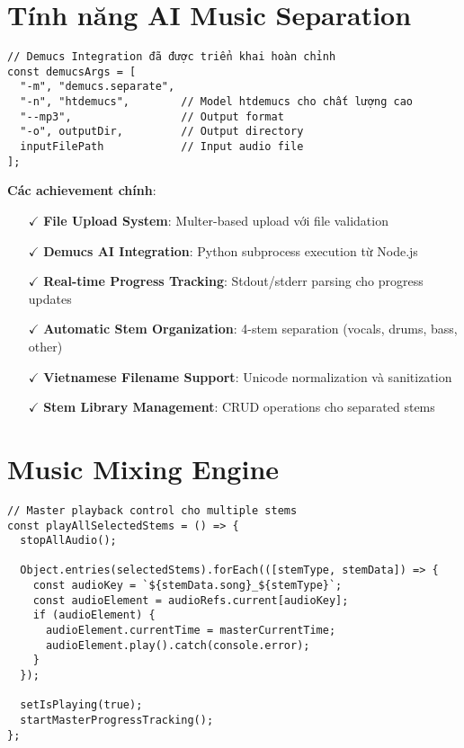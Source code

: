 \documentclass[12pt,a4paper]{article}
\begin{document}
\section{Tính năng AI Music Separation}

\begin{lstlisting}[caption={Demucs Integration hoàn chỉnh}]
// Demucs Integration đã được triển khai hoàn chỉnh
const demucsArgs = [
  "-m", "demucs.separate",
  "-n", "htdemucs",        // Model htdemucs cho chất lượng cao
  "--mp3",                 // Output format
  "-o", outputDir,         // Output directory
  inputFilePath            // Input audio file
];
\end{lstlisting}

\textbf{Các achievement chính}:
\begin{itemize}
\item[$\checkmark$] \textbf{File Upload System}: Multer-based upload với file validation
\item[$\checkmark$] \textbf{Demucs AI Integration}: Python subprocess execution từ Node.js
\item[$\checkmark$] \textbf{Real-time Progress Tracking}: Stdout/stderr parsing cho progress updates
\item[$\checkmark$] \textbf{Automatic Stem Organization}: 4-stem separation (vocals, drums, bass, other)
\item[$\checkmark$] \textbf{Vietnamese Filename Support}: Unicode normalization và sanitization
\item[$\checkmark$] \textbf{Stem Library Management}: CRUD operations cho separated stems
\end{itemize}

\section{Music Mixing Engine}

\begin{lstlisting}[caption={Master playback control cho multiple stems}]
// Master playback control cho multiple stems
const playAllSelectedStems = () => {
  stopAllAudio();
  
  Object.entries(selectedStems).forEach(([stemType, stemData]) => {
    const audioKey = `${stemData.song}_${stemType}`;
    const audioElement = audioRefs.current[audioKey];
    if (audioElement) {
      audioElement.currentTime = masterCurrentTime;
      audioElement.play().catch(console.error);
    }
  });
  
  setIsPlaying(true);
  startMasterProgressTracking();
};
\end{lstlisting}
\end{document}
